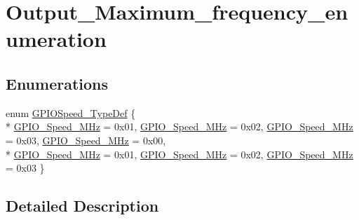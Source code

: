 \hypertarget{group___output___maximum__frequency__enumeration}{\section{Output\-\_\-\-Maximum\-\_\-frequency\-\_\-enumeration}
\label{group___output___maximum__frequency__enumeration}
}
\subsection*{Enumerations}
\begin{DoxyCompactItemize}
\item 
enum \hyperlink{group___output___maximum__frequency__enumeration_ga062ad92b67b4a1f301c161022cf3ba8e}{G\-P\-I\-O\-Speed\-\_\-\-Type\-Def} \{ \\*
\hyperlink{group___output___maximum__frequency__enumeration_ga062ad92b67b4a1f301c161022cf3ba8ea9bff9e174639332007c914483361be18}{G\-P\-I\-O\-\_\-\-Speed\-\_\-M\-Hz} = 0x01, 
\hyperlink{group___output___maximum__frequency__enumeration_ga062ad92b67b4a1f301c161022cf3ba8ea8c567e4b0186e3708cd7020c13da6439}{G\-P\-I\-O\-\_\-\-Speed\-\_\-M\-Hz} = 0x02, 
\hyperlink{group___output___maximum__frequency__enumeration_ga062ad92b67b4a1f301c161022cf3ba8ea9c47db10456202ac05134b12738ce581}{G\-P\-I\-O\-\_\-\-Speed\-\_\-M\-Hz} = 0x03, 
\hyperlink{group___output___maximum__frequency__enumeration_ga062ad92b67b4a1f301c161022cf3ba8ea9bff9e174639332007c914483361be18}{G\-P\-I\-O\-\_\-\-Speed\-\_\-M\-Hz} = 0x00, 
\\*
\hyperlink{group___output___maximum__frequency__enumeration_ga062ad92b67b4a1f301c161022cf3ba8ea59a0acdf2ccd1b4b8d507e845e497c62}{G\-P\-I\-O\-\_\-\-Speed\-\_\-M\-Hz} = 0x01, 
\hyperlink{group___output___maximum__frequency__enumeration_ga062ad92b67b4a1f301c161022cf3ba8ea9c47db10456202ac05134b12738ce581}{G\-P\-I\-O\-\_\-\-Speed\-\_\-M\-Hz} = 0x02, 
\hyperlink{group___output___maximum__frequency__enumeration_ga062ad92b67b4a1f301c161022cf3ba8ea195a0e73cd63d7f5b5d41bd0155eacbb}{G\-P\-I\-O\-\_\-\-Speed\-\_\-M\-Hz} = 0x03
 \}
\end{DoxyCompactItemize}


\subsection{Detailed Description}


